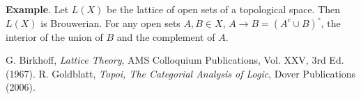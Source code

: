 \documentclass[12pt]{article}
\begin{document}
\textbf{Example}.  Let $L(X)$ be the lattice of open sets of a topological space.  Then $L(X)$ is Brouwerian.  For any open sets $A,B\in X$, $A\to B=(A^c\cup B)^{\circ}$, the interior of the union of $B$ and the complement of $A$.

\begin{thebibliography}{8}
 G. Birkhoff, {\em Lattice Theory}, AMS Colloquium Publications, Vol. XXV, 3rd Ed. (1967).
 R. Goldblatt, {\em Topoi, The Categorial Analysis of Logic}, Dover Publications (2006).
\end{thebibliography}

\end{document}
